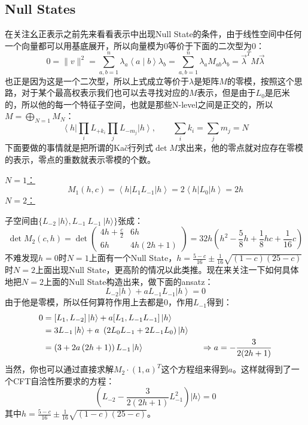 \subsection{Null States}
在关注幺正表示之前先来看看表示中出现Null State的条件，由于线性空间中任何一个向量都可以用基底展开，所以向量模为0等价于下面的二次型为0：
\begin{equation}
	0=\|v\|^2=\sum_{a,b=1}^n\lambda_a\left<a\mid b\right>\lambda_b=\sum_{a,b=1}^n\lambda_aM_{ab}\lambda_b=\vec{\lambda}^TM\vec{\lambda}
\end{equation}
也正是因为这是一个二次型，所以上式成立等价于$\lambda$是矩阵$M$的零模，按照这个思路，对于某个最高权表示我们也可以去寻找对应的$M$表示，但是由于$L_0$是厄米的，所以他的每一个特征子空间，也就是那些N-level之间是正交的，所以$M=\bigoplus_{N=1} M_N$：
\begin{equation}
	\left<h\right|\prod_iL_{+k_i}\left.\prod_jL_{-m_j}\left|h\right>,\quad\quad\sum_ik_i=\sum_jm_j=N\right. 
\end{equation}
下面要做的事情就是把所谓的Ka\v{c}行列式$\det M$求出来，他的零点就对应存在零模的表示，零点的重数就表示零模的个数。
\begin{example}
	\underline{$N=1$：}
	\begin{equation}
		M_1(h,c)=\left\langle h\right|L_1L_{-1}\left|h\right\rangle=2\left\langle h\right|L_0\left|h\right\rangle=2h
	\end{equation}
	\underline{$N=2$：}
	
	子空间由$\{L_{-2}~|h\rangle ,L_{-1}~L_{-1}~|h\rangle \}$张成：
	\begin{equation}
		\det M_2(c,h)=\det\begin{pmatrix}4h+\frac c2&6h\\6h&4h(2h+1)\end{pmatrix}=32h\left(h^2-\frac58h+\frac18hc+\frac1{16}c\right)
	\end{equation}
	不难发现$h=0$时$N=1$上面有一个Null State，$h=\frac{5-c}{16}\pm\frac1{16}\sqrt{(1-c)(25-c)}$时$N=2$上面出现Null State，更高阶的情况以此类推。现在来关注一下如何具体地把$N=2$上面的Null State构造出来，做下面的ansatz：
	\begin{equation}
		L_{-2}\left|h\right\rangle+aL_{-1}L_{-1}\left|h\right\rangle=0
	\end{equation}
	由于他是零模，所以任何算符作用上去都是0，作用$L_{-1}$得到：
	\begin{equation}
		\begin{aligned}
			0& =[L_1,L_{-2}]\ket{h}+a[L_1,L_{-1}L_{-1}]\ket{h}  \\
			&=3L_{-1}\left|h\right\rangle+a~\left(2L_0L_{-1}+2L_{-1}L_0\right)|h\rangle  \\
			&=\left(3+2a\left(2h+1\right)\right)L_{-1}\left|h\right\rangle \quad\quad\quad\qquad\qquad\Rightarrow a=-\frac{3}{2(2h+1)}
		\end{aligned}
	\end{equation}
	当然，你也可以通过直接求解$M_2 \cdot (1,a)^T$这个方程组来得到$a$。这样就得到了一个CFT自洽性所要求的方程：
	\begin{equation}
		\left(L_{-2}-\frac3{2(2h+1)}L_{-1}^2\right)|h\rangle=0
	\end{equation}
	其中$h=\frac{5-c}{16}\pm\frac1{16}\sqrt{(1-c)(25-c)}$。
\end{example}
